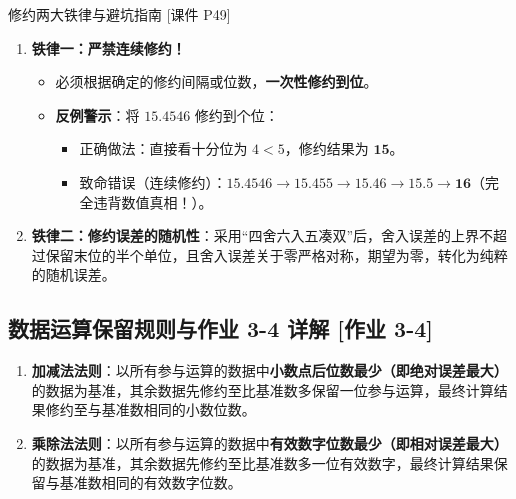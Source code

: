 \documentclass[11pt,a4paper]{ctexart}
\begin{document}
\begin{exambox}{修约两大铁律与避坑指南 [课件 P49]}
\begin{enumerate}
    \item \textbf{铁律一：严禁连续修约！}
    \begin{itemize}
        \item 必须根据确定的修约间隔或位数，\textbf{一次性修约到位}。
        \item \textbf{反例警示}：将 $15.4546$ 修约到个位：
        \begin{itemize}
            \item 正确做法：直接看十分位为 $4 < 5$，修约结果为 $\mathbf{15}$。
            \item 致命错误（连续修约）：$15.4546 \to 15.455 \to 15.46 \to 15.5 \to \mathbf{16}$（完全违背数值真相！）。
        \end{itemize}
    \end{itemize}
    \item \textbf{铁律二：修约误差的随机性}：采用“四舍六入五凑双”后，舍入误差的上界不超过保留末位的半个单位，且舍入误差关于零严格对称，期望为零，转化为纯粹的随机误差。
\end{enumerate}
\end{exambox}

\subsection{数据运算保留规则与作业 3-4 详解 \textnormal{[作业 3-4]}}

\begin{enumerate}
    \item \textbf{加减法法则}：以所有参与运算的数据中\textbf{小数点后位数最少（即绝对误差最大）}的数据为基准，其余数据先修约至比基准数多保留一位参与运算，最终计算结果修约至与基准数相同的小数位数。
    \item \textbf{乘除法法则}：以所有参与运算的数据中\textbf{有效数字位数最少（即相对误差最大）}的数据为基准，其余数据先修约至比基准数多一位有效数字，最终计算结果保留与基准数相同的有效数字位数。
\end{enumerate}
\end{document}
